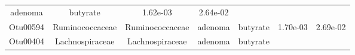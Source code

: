 \documentclass[11pt,]{article}
\begin{document}
\begin{longtable}[]{@{}ccccccc@{}}
\begin{minipage}[t]{0.09\columnwidth}
adenoma\strut
\end{minipage} & \begin{minipage}[t]{0.11\columnwidth}\centering\strut
butyrate\strut
\end{minipage} & \begin{minipage}[t]{0.09\columnwidth}\centering\strut
1.62e-03\strut
\end{minipage} & \begin{minipage}[t]{0.09\columnwidth}\centering\strut
2.64e-02\strut
\end{minipage}\tabularnewline
\begin{minipage}[t]{0.09\columnwidth}\centering\strut
Otu00594\strut
\end{minipage} & \begin{minipage}[t]{0.17\columnwidth}\centering\strut
Ruminococcaceae\strut
\end{minipage} & \begin{minipage}[t]{0.17\columnwidth}\centering\strut
Ruminococcaceae\strut
\end{minipage} & \begin{minipage}[t]{0.09\columnwidth}\centering\strut
adenoma\strut
\end{minipage} & \begin{minipage}[t]{0.11\columnwidth}\centering\strut
butyrate\strut
\end{minipage} & \begin{minipage}[t]{0.09\columnwidth}\centering\strut
1.70e-03\strut
\end{minipage} & \begin{minipage}[t]{0.09\columnwidth}\centering\strut
2.69e-02\strut
\end{minipage}\tabularnewline
\begin{minipage}[t]{0.09\columnwidth}\centering\strut
Otu00404\strut
\end{minipage} & \begin{minipage}[t]{0.17\columnwidth}\centering\strut
Lachnospiraceae\strut
\end{minipage} & \begin{minipage}[t]{0.17\columnwidth}\centering\strut
Lachnospiraceae\strut
\end{minipage} & \begin{minipage}[t]{0.09\columnwidth}\centering\strut
adenoma\strut
\end{minipage} & \begin{minipage}[t]{0.11\columnwidth}\centering\strut
butyrate\strut
\end{minipage} & \begin{minipage}[t]{0.09\columnwidth}\centering\strut

\end{minipage}
\end{longtable}
\end{document}
